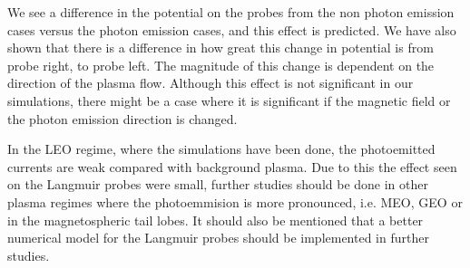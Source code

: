 
We see a difference in the potential on the probes from the non photon emission cases versus
the photon emission cases, and this effect is predicted. We have also shown that there
is a difference in how great this change in potential is from probe right, to probe left.
The magnitude of this change is dependent on the direction of the plasma flow. Although this effect
is not significant in our simulations, there might be a case where it is significant if
the magnetic field or the photon emission direction is changed.

In the LEO regime, where the simulations have been done, the photoemitted currents are weak compared with
background plasma. Due to this the effect seen on the Langmuir probes were small, further studies should be done
in other plasma regimes where the photoemmision is more pronounced, i.e. MEO, GEO or in the magnetospheric tail lobes.
It should also be mentioned that a better numerical model for the Langmuir probes should be implemented in further
studies.